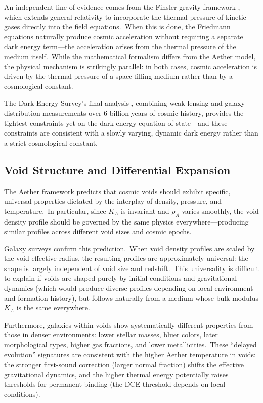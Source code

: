﻿\documentclass[12pt,letterpaper]{article}
\newcommand{\rhoa}{\rho_{\!A}}
\newcommand{\Ka}{K_{\!A}}
\begin{document}
An independent line of evidence comes from the Finsler gravity framework
\cite{hohmann2026}, which extends general relativity to incorporate the thermal
pressure of kinetic gases directly into the field equations.\ When this is done,
the Friedmann equations naturally produce cosmic acceleration without requiring
a separate dark energy term---the acceleration arises from the thermal pressure
of the medium itself.\ While the mathematical formalism differs from the Aether
model, the physical mechanism is strikingly parallel: in both cases, cosmic
acceleration is driven by the thermal pressure of a space-filling medium rather
than by a cosmological constant.

The Dark Energy Survey's final analysis \cite{des2026}, combining weak lensing and
galaxy distribution measurements over 6 billion years of cosmic history, provides
the tightest constraints yet on the dark energy equation of state---and these
constraints are consistent with a slowly varying, dynamic dark energy rather than
a strict cosmological constant.


\subsection{Void Structure and Differential Expansion}

The Aether framework predicts that cosmic voids should exhibit specific, universal
properties dictated by the interplay of density, pressure, and temperature.\ In
particular, since $\Ka$ is invariant and $\rhoa$ varies smoothly, the void density
profile should be governed by the same physics everywhere---producing similar
profiles across different void sizes and cosmic epochs.

Galaxy surveys confirm this prediction.\ When void density profiles are scaled by
the void effective radius, the resulting profiles are approximately universal:
the shape is largely independent of void size and redshift.\ This universality
is difficult to explain if voids are shaped purely by initial conditions and
gravitational dynamics (which would produce diverse profiles depending on local
environment and formation history), but follows naturally from a medium whose
bulk modulus $\Ka$ is the same everywhere.

Furthermore, galaxies within voids show systematically different properties from
those in denser environments: lower stellar masses, bluer colors, later
morphological types, higher gas fractions, and lower metallicities.\ These
``delayed evolution'' signatures are consistent with the higher Aether
temperature in voids: the stronger first-sound correction (larger normal
fraction) shifts the effective gravitational dynamics, and the higher
thermal energy potentially raises thresholds for permanent binding (the
DCE threshold depends on local conditions).
\end{document}
